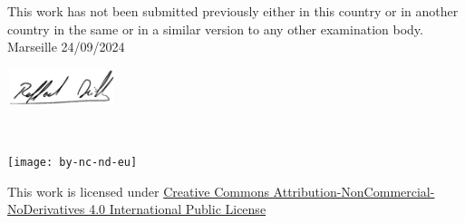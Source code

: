     This work has not been submitted previously either in this country or in another country in the same or in a similar version to any other examination body.\\
    
    Marseille 24/09/2024
    
    \begin{flushright}\includegraphics[width=120px,height=40px]{logo/signature_DULL.png}\end{flushright}%

    ~\vfill
    \begin{center}
        \begin{minipage}[c]{0.25\linewidth}
            \texttt{[image: by-nc-nd-eu]}
        \end{minipage}\hfill
    \end{center}

    This work is licensed under \href{https://creativecommons.org/licenses/by-nc-nd/4.0/deed.en}{Creative Commons Attribution-NonCommercial-NoDerivatives 4.0 International Public License}
\fi

